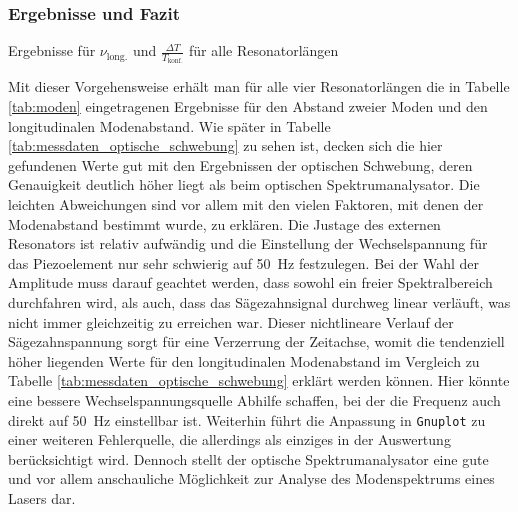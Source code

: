 \documentclass[11pt, a4paper]{article}
\numberwithin{equation}{section}
\begin{document}
\subsubsection{Ergebnisse und Fazit}

\begin{table}[htb]
\centering

\caption{Ergebnisse für $\nu_\text{long.}$ und $\frac{\Delta T}{T_\text{konf.}}$ für alle Resonatorlängen}
\label{tab:moden}
\end{table}
Mit dieser Vorgehensweise erhält man für alle vier Resonatorlängen die in Tabelle \ref{tab:moden} eingetragenen Ergebnisse für den Abstand zweier Moden und den longitudinalen Modenabstand.
Wie später in Tabelle \ref{tab:messdaten_optische_schwebung} zu sehen ist, decken sich die hier gefundenen Werte gut mit den Ergebnissen der optischen Schwebung, deren Genauigkeit deutlich höher liegt als beim optischen Spektrumanalysator.
Die leichten Abweichungen sind vor allem mit den vielen Faktoren, mit denen der Modenabstand bestimmt wurde, zu erklären.
Die Justage des externen Resonators ist relativ aufwändig und die Einstellung der Wechselspannung für das Piezoelement nur sehr schwierig auf \SI{50}{\hertz} festzulegen.
Bei der Wahl der Amplitude muss darauf geachtet werden, dass sowohl ein freier Spektralbereich durchfahren wird, als auch, dass das Sägezahnsignal durchweg linear verläuft, was nicht immer gleichzeitig zu erreichen war.
Dieser nichtlineare Verlauf der Sägezahnspannung sorgt für eine Verzerrung der Zeitachse, womit die tendenziell höher liegenden Werte für den longitudinalen Modenabstand im Vergleich zu Tabelle \ref{tab:messdaten_optische_schwebung} erklärt werden können.
Hier könnte eine bessere Wechselspannungsquelle Abhilfe schaffen, bei der die Frequenz auch direkt auf \SI{50}{\hertz} einstellbar ist.
Weiterhin führt die Anpassung in \texttt{Gnuplot} zu einer weiteren Fehlerquelle, die allerdings als einziges in der Auswertung berücksichtigt wird.
Dennoch stellt der optische Spektrumanalysator eine gute und vor allem anschauliche Möglichkeit zur Analyse des Modenspektrums eines Lasers dar.
\end{document}
